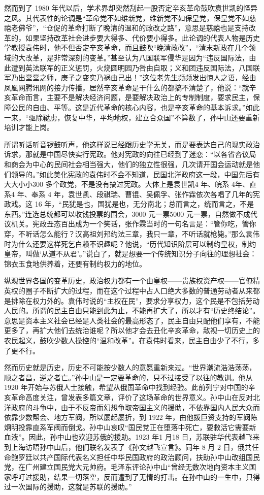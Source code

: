 然而到了 1980 年代以后，学术界却突然刮起一股否定辛亥革命鼓吹袁世凯的怪异之风。其代表性的论调是“革命党不如维新党，维新党不如保皇党，保皇党不如慈禧老佛爷”，“仓促的革命打断了晚清的温和的政改之路”，意思是慈禧也是支持改革的，如果坚持改革社会进步要大得多、代价要小得多。此论调的代表人物是历史学教授袁伟时，他不但否定辛亥革命，而且鼓吹“晚清政改”，“清末新政在几个领域的大改革，是非常深刻的变革。”甚至认为八国联军侵华是因为“违反国际法，由此遭到英法联军的正义惩罚，火烧圆明园乃咎由自取；义和团违反国际法，八国联军乃出堂堂之师，庚子之变实乃祸由己出！”这位老先生频频发出惊人之语，经由凤凰网腾讯网的接力传播，居然辛亥革命是干什么的都搞不清楚了，他说：“就辛亥革命而言，主要不是解决经济问题，是要解决政治上的专制制度，要求民主，保障公民的自由、平等。这是近代革命的核心内容，也是辛亥革命的基本诉求。”如此一来，“驱除鞑虏，恢复中华，平均地权，建立合众国”不算数了，孙中山还要重新培训才能上岗。

所谓听话听音锣鼓听声，他这样说已经跟历史学无关，而是要表达自己的现实政治诉求，那就是中国尽快实行宪政。他对宪政的向往已经到了迷恋：“以各省咨议局和商会为中心的民间社会相当强大，他们的独立性很强，几次请开国会运动就是他们领导的。”如此美化宪政的袁伟时不会不知道，民国北洋政府这一段，中国先后有大大小小300 多个政党，不是没有搞过宪政。大体上是袁世凯4 年、皖系 4年、直系4 年、奉系 4 年，袁世凯、段祺瑞、曹锟、吴佩孚、张作霖依次各唱了几年的宪政戏。这 16 年，“民犹是也，国犹是也，无分南北；总而言之，统而言之，不是东西。”连选总统都可以收钱投票的国会，3000 元一票5000 元一票，自然做不成代议机关。宪政丑态百出成为一个笑话，张作霖当时的一句名言是：“管你吃，管你穿，不听话怎么能行？汉高祖刘邦约法三章，我只一章，不听话就枪毙。”那么袁伟时为什么还要这样死乞白赖不识趣呢？他说，“历代知识阶层可以制约皇权，制约皇帝，叫做‘从道不从君’。”说白了，就是想要一个传统知识分子向往的理想社会：锦衣玉食地供养着，还要有制约权力的地位。

纵观世界各国的变革历史，政治权力都有一个由皇权——贵族权资产权——官僚精英权的圈子不断扩大的过程，而在这个过程中占人口绝大多数的普通劳动者从来都是排除在权力外的。袁伟时说的“主权在民”，要求分享权力，这个民是不包括劳动人民的。所谓的民主自由只能到此为止，不能再扩大了，所以才有“历史终结论”。意思是资本主义社会已经是人类社会的最高形态了，民主自由只配他们享有，不能更多了，再扩大他们去统治谁呢？所以他才会去丑化辛亥革命，敌视一切历史上的农民起义，鼓吹少数人操控的“温和改革”。在袁伟时看来，民主自由少了不行，多了更不行。

然而历史就是历史，历史不可能按少数人的意愿重新来过。“世界潮流浩浩荡荡，顺之者昌，逆之者亡。”孙中山是一定要革命的，只不过接受了以往的教训。他从 1920 年开始与苏俄人士接触，希望从俄国革命中找到经验。此前列宁对中国的辛亥革命高度关注，曾发表多篇文章，评价了这场革命的世界意义。孙中山在反对北洋政府的斗争中，由于不反帝而幻想争取帝国主义的援助，不依靠国内人民大众而依靠少数帮会、地方军阀，所以屡起屡折，到 1922 年，由他拨巨资支持的军阀陈炯明投靠直系军阀而倒戈。孙中山哀叹“国民党正在堕落中死亡，要救活它需要新血液”。因此，孙中山也欢迎苏俄的援助。1923 年1 月18 日，苏联驻华代表越飞来到上海访晤孙中山后，他们联名发表了《孙文越飞宣言》。同年 8 月 2 日，俄共任命鲍罗廷以共产国际代表名义担任中华民国政府的政治顾问，扶助孙中山改组国民党，在广州建立国民党大元帅府。毛泽东评论孙中山“曾经无数次地向资本主义国家呼吁过援助，结果一切落空，反而遭到了无情的打击。在孙中山的一生中，只得过一次国际的援助，这就是苏联的援助。”

